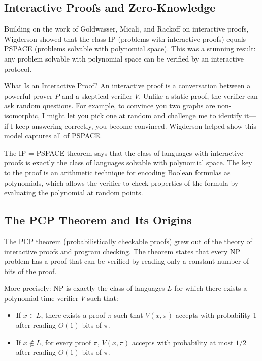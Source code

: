 \subsection{Interactive Proofs and Zero-Knowledge}

Building on the work of Goldwasser, Micali, and Rackoff on interactive proofs, Wigderson showed that the class IP (problems with interactive proofs) equals PSPACE (problems solvable with polynomial space). This was a stunning result: any problem solvable with polynomial space can be verified by an interactive protocol.

\begin{primer}{What Is an Interactive Proof?}
An interactive proof is a conversation between a powerful prover $P$ and a skeptical verifier $V$. Unlike a static proof, the verifier can ask random questions. For example, to convince you two graphs are non-isomorphic, I might let you pick one at random and challenge me to identify it---if I keep answering correctly, you become convinced. Wigderson helped show this model captures all of PSPACE.
\end{primer}

The IP = PSPACE theorem says that the class of languages with interactive proofs is exactly the class of languages solvable with polynomial space. The key to the proof is an arithmetic technique for encoding Boolean formulas as polynomials, which allows the verifier to check properties of the formula by evaluating the polynomial at random points.

\subsection{The PCP Theorem and Its Origins}

The PCP theorem (probabilistically checkable proofs) grew out of the theory of interactive proofs and program checking. The theorem states that every NP problem has a proof that can be verified by reading only a constant number of bits of the proof.

More precisely: NP is exactly the class of languages $L$ for which there exists a polynomial-time verifier $V$ such that:
\begin{itemize}
\item If $x \in L$, there exists a proof $\pi$ such that $V(x, \pi)$ accepts with probability 1 after reading $O(1)$ bits of $\pi$.
\item If $x \notin L$, for every proof $\pi$, $V(x, \pi)$ accepts with probability at most $1/2$ after reading $O(1)$ bits of $\pi$.
\end{itemize}

